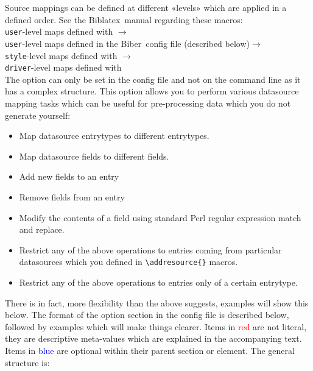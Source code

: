 \documentclass{ltxdockit}
\newcommand*{\biber}{Biber\xspace}
\newcommand*{\biblatex}{Biblatex\xspace}
\begin{document}
Source mappings can be defined at different «levels» which are applied
in a defined order. See the \biblatex\ manual regarding these macros:\\[2ex]

\noindent \texttt{user}-level maps defined with $\rightarrow$\\
\hspace*{1em}\texttt{user}-level maps defined in the \biber\ config file (described below)$\rightarrow$\\
\hspace*{2em}\texttt{style}-level maps defined with $\rightarrow$\\
\hspace*{3em}\texttt{driver}-level maps defined with \\[2ex]

The  option can only be set in the config file
and not on the command line as it has a complex structure. This
option allows you to perform various datasource mapping
tasks which can be useful for pre-processing data which you do not
generate yourself:

\begin{itemize}
\item Map datasource entrytypes to different entrytypes.
\item Map datasource fields to different fields.
\item Add new fields to an entry
\item Remove fields from an entry
\item Modify the contents of a field using standard Perl regular expression
  match and replace.
\item Restrict any of the above operations to entries coming from
  particular datasources which you defined in \verb+\addresource{}+ macros.
\item Restrict any of the above operations to entries only of a certain
  entrytype.
\end{itemize}

\noindent There is in fact, more flexibility than the above suggests,
examples will show this below. The format of the  option
section in the config file is described below, followed by examples which
will make things clearer. Items in \textcolor{red}{red} are not literal,
they are descriptive meta-values which are explained in the accompanying
text. Items in \textcolor{blue}{blue} are optional within their parent
section or element. The general structure is:
\end{document}
